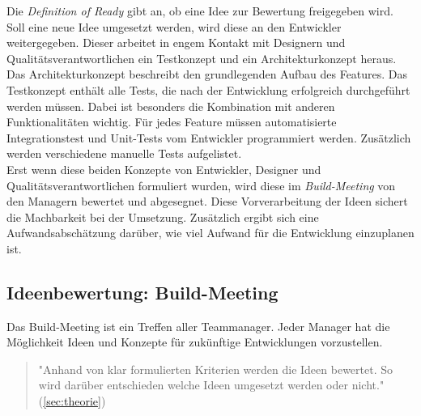 Die \textit{Definition of Ready} gibt an, ob eine Idee zur Bewertung freigegeben wird.
Soll eine neue Idee umgesetzt werden, wird diese an den Entwickler weitergegeben. Dieser 
arbeitet in engem Kontakt mit Designern und Qualitätsverantwortlichen ein Testkonzept und ein Architekturkonzept heraus. 
Das Architekturkonzept beschreibt den grundlegenden Aufbau des Features. 
Das Testkonzept enthält alle Tests, die nach der Entwicklung erfolgreich durchgeführt werden müssen. Dabei ist besonders die Kombination mit anderen Funktionalitäten 
wichtig. Für jedes Feature müssen automatisierte Integrationstest und Unit-Tests vom Entwickler programmiert werden. Zusätzlich werden verschiedene
manuelle Tests aufgelistet.\\
Erst wenn diese beiden Konzepte von Entwickler, Designer und Qualitätsverantwortlichen formuliert wurden, wird diese im 
\textit{Build-Meeting} von den Managern bewertet und abgesegnet. Diese Vorverarbeitung der Ideen sichert die Machbarkeit bei der Umsetzung. Zusätzlich ergibt 
sich eine Aufwandsabschätzung darüber, wie viel Aufwand für die Entwicklung einzuplanen ist. 

\subsection{Ideenbewertung: Build-Meeting}
Das Build-Meeting ist ein Treffen aller Teammanager. Jeder Manager hat die Möglichkeit Ideen und Konzepte für zukünftige Entwicklungen 
vorzustellen. 

\begin{quote}"Anhand von klar formulierten Kriterien werden die Ideen bewertet. So wird darüber entschieden welche Ideen umgesetzt werden oder nicht."(\autoref{sec:theorie})\end{quote}

